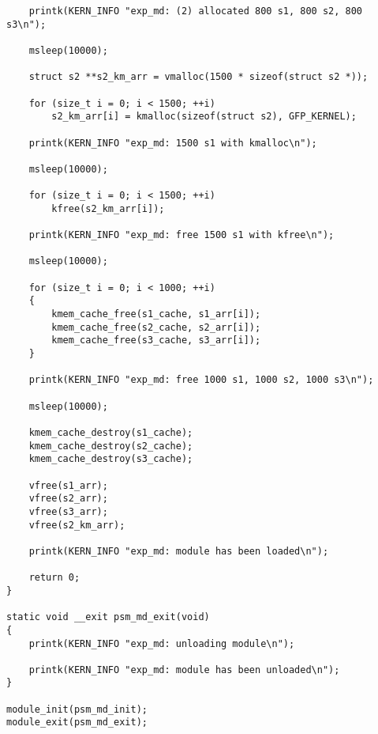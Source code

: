 \begin{lstlisting}
	printk(KERN_INFO "exp_md: (2) allocated 800 s1, 800 s2, 800 s3\n");
	
	msleep(10000);
	
	struct s2 **s2_km_arr = vmalloc(1500 * sizeof(struct s2 *));
	
	for (size_t i = 0; i < 1500; ++i)
		s2_km_arr[i] = kmalloc(sizeof(struct s2), GFP_KERNEL);
	
	printk(KERN_INFO "exp_md: 1500 s1 with kmalloc\n");
	
	msleep(10000);
	
	for (size_t i = 0; i < 1500; ++i)
		kfree(s2_km_arr[i]);
	
	printk(KERN_INFO "exp_md: free 1500 s1 with kfree\n");
	
	msleep(10000);
	
	for (size_t i = 0; i < 1000; ++i)
	{
		kmem_cache_free(s1_cache, s1_arr[i]);
		kmem_cache_free(s2_cache, s2_arr[i]);
		kmem_cache_free(s3_cache, s3_arr[i]);
	}
	
	printk(KERN_INFO "exp_md: free 1000 s1, 1000 s2, 1000 s3\n");
	
	msleep(10000);
	
	kmem_cache_destroy(s1_cache);
	kmem_cache_destroy(s2_cache);
	kmem_cache_destroy(s3_cache);
	
	vfree(s1_arr);
	vfree(s2_arr);
	vfree(s3_arr);
	vfree(s2_km_arr);
	
	printk(KERN_INFO "exp_md: module has been loaded\n");
	
	return 0;
}

static void __exit psm_md_exit(void)
{
	printk(KERN_INFO "exp_md: unloading module\n");
	
	printk(KERN_INFO "exp_md: module has been unloaded\n");
}

module_init(psm_md_init);
module_exit(psm_md_exit);
\end{lstlisting}
